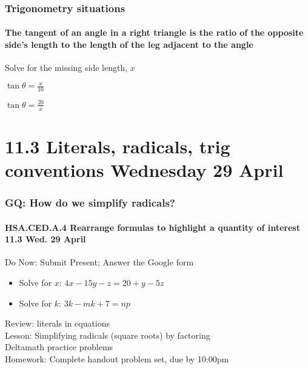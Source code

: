 \documentclass{beamer}
\begin{document}
\frame
{
  \frametitle{Trigonometry situations}
  \framesubtitle{The tangent of an angle in a right triangle is the ratio of the opposite side's length to the length of the leg adjacent to the angle}

  \Large{
Solve for the missing side length, $x$
  \begin{enumerate}
    \begin{multicols}{2}
      \item $\displaystyle \tan \theta=\frac{x}{10}$
      \item $\displaystyle \tan \theta=\frac{20}{x}$
    \end{multicols}
    \end{enumerate} \vspace{5cm}
}
}

\section{11.3 Literals, radicals, trig conventions Wednesday 29 April} 
\frame
{
  \frametitle{GQ: How do we simplify radicals?}
  \framesubtitle{HSA.CED.A.4 Rearrange formulas to highlight a quantity of interest \hfill \alert{11.3 Wed. 29 April}}

  \begin{block}{Do Now: Submit Present; Answer the Google form}
    \begin{itemize}
      \item Solve for $x$: $4x-15y-z= 20+y-5z$
      \item Solve for $k$: $3k-mk+7=np$
    \end{itemize}
    \end{block}
    Review: literals in equations\\[0.25cm]
    Lesson: Simplifying radicals (square roots) by factoring\\
    Deltamath practice problems \\[0.25cm]
    Homework: Complete handout problem set, due by 10:00pm}
\end{document}

